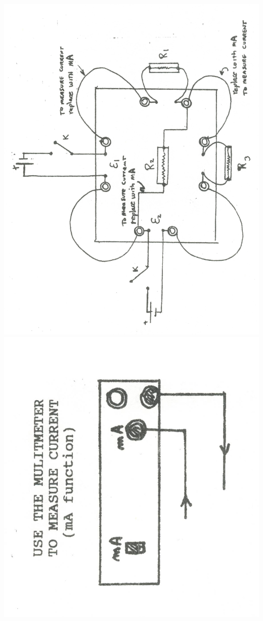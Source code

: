 \begin{multicols}{2}
\begin{center}
   {\includegraphics[scale=0.9]{5bgraf/fig_10b}\label{f:fig10b}}
   {\includegraphics[scale=0.4]{5bgraf/fig_10a}\label{f:fig10a}}
	\label{f:circboard}
\end{center}



\end{multicols}
